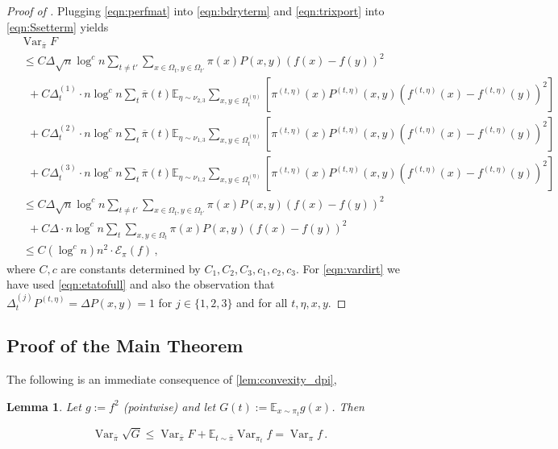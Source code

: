 \documentclass[a4paper, 12p]{article}
\numberwithin{equation}{section}
\newcommand{\Exp}{\mathbb{E}}
\newcommand{\piproj}{\overline{\pi}}
\newcommand{\var}{\operatorname{Var}}
\newcommand{\dir}{\mathcal{E}}
\newtheorem{lemma}[theorem]{Lemma}
\begin{document}
\begin{proof}[Proof of ]
Plugging \eqref{eqn:perfmat} into \eqref{eqn:bdryterm} and  \eqref{eqn:trixport} into \eqref{eqn:Ssetterm} yields
\begin{align}
    & \var_{\piproj} F\nonumber\\
    &~\leq C \Delta \sqrt n \log^c n \sum_{t \neq t'}\sum_{x \in \Omega_t, y \in \Omega_{t'}} \pi(x)P(x, y)(f(x) - f(y))^2 \nonumber  \\
    &~~~ + C \Delta_t^{(1)}\cdot n\log^c n \sum_{t}\piproj(t)\Exp_{\eta \sim \nu_{2,3}}\sum_{x, y \in \Omega_t^{(\eta)}}\left[ \pi^{(t,\eta)}(x)P^{(t,\eta)}(x, y)(f^{(t,\eta)}(x) - f^{(t,\eta)}(y))^2\right] \nonumber  \\ 
    &~~~ + C \Delta_t^{(2)}\cdot n \log^c n \sum_{t}\piproj(t)\Exp_{\eta \sim \nu_{1,3}}\sum_{x, y \in \Omega_t^{(\eta)}}\left[ \pi^{(t,\eta)}(x)P^{(t,\eta)}(x, y)(f^{(t,\eta)}(x) - f^{(t,\eta)}(y))^2\right] \nonumber  \\ 
    &~~~ + C \Delta_t^{(3)}\cdot n \log^c n \sum_{t}\piproj(t)\Exp_{\eta \sim \nu_{1,2}}\sum_{x, y \in \Omega_t^{(\eta)}}\left[ \pi^{(t,\eta)}(x)P^{(t,\eta)}(x, y)(f^{(t,\eta)}(x) - f^{(t,\eta)}(y))^2\right] \nonumber  \\ 
    &~\leq C \Delta \sqrt n \log^c n \sum_{t \neq t'}\sum_{x \in \Omega_t, y \in \Omega_{t'}} \pi(x)P(x, y)(f(x) - f(y))^2  \nonumber \\
    &~~~ + C \Delta\cdot n\log^c n \sum_t \sum_{x, y \in \Omega_t} \pi(x)P(x, y)(f(x) - f(y))^2 \label{eqn:vardirt} \\
    &~\leq C(\log^cn)n^{2}\cdot \dir_\pi(f)\,,\nonumber
\end{align}
where $C, c$ are constants determined by $C_1, C_2, C_3, c_1, c_2, c_3$. For \eqref{eqn:vardirt} we have used \eqref{eqn:etatofull} and also the observation that $\Delta_t^{(j)}P^{(t,\eta)} = \Delta P(x, y) = 1$ for $j \in \{1, 2, 3\}$ and for all $t, \eta, x, y$. 
\end{proof}

\subsection{Proof of the Main Theorem}
The following is an immediate consequence of \cref{lem:convexity_dpi},
\begin{lemma}
Let $g:= f^2$ (pointwise) and let $G(t) := \Exp_{x \sim \pi_t} g(x)$. Then

    \[
        \var_{\bar \pi} \sqrt{G} \leq \var_{\bar \pi} F + \Exp_{t \sim \bar \pi} \var_{\pi_t} f = \var_\pi f\,.
    \]
\label{lem:sqrtG}
\end{lemma}
\end{document}

